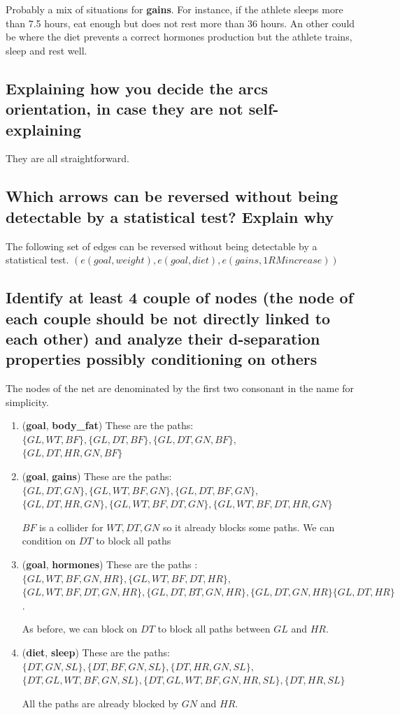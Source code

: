 \documentclass[11pt]{article}
\begin{document}
Probably a mix of situations for \textbf{gains}. For instance, if the athlete sleeps more than 7.5 hours, eat enough but does not rest more than 36 hours. An other could be where the diet prevents a correct hormones production but the athlete trains, sleep and rest well.

\subsection{Explaining how you decide the arcs orientation, in case they are not self- explaining}

They are all straightforward.

\subsection{Which arrows can be reversed without being detectable by a statistical test? Explain why}

The following set of edges can be reversed without being detectable by a statistical test.
$(e(goal, weight), e(goal, diet), e(gains, 1RM increase))$


\subsection{Identify at least 4 couple of nodes (the node of each couple should be not directly linked to each other) and analyze their d-separation properties possibly conditioning on others}

The nodes of the net are denominated by the first two consonant in the name for simplicity.
\begin{enumerate}
	\item (\textbf{goal}, \textbf{body\_fat})
These are the paths: $\{GL,WT,BF\}, \{GL,DT,BF\}, \{GL,DT,GN,BF\},$\\ $\{GL,DT,HR,GN, BF\}$

\item (\textbf{goal}, \textbf{gains})
These are the paths: $\{GL,DT,GN\}, \{GL, WT, BF, GN\}, \{GL,DT, BF, GN\},$\\
$\{GL, DT ,HR, GN\}, \{GL, WT, BF, DT, GN \}, \{GL, WT, BF, DT, HR, GN \}$


$BF$ is a collider for $WT, DT, GN$ so it already blocks some paths. We can condition on $DT$ to block all paths
\item (\textbf{goal}, \textbf{hormones})
These are the paths : $\{GL, WT, BF, GN, HR \}, \{GL, WT, BF, DT, HR \},$\\
$\{GL, WT, BF, DT, GN, HR \},\{GL, DT, BT, GN, HR \}, \{GL, DT, GN, HR \} \{GL, DT, HR \}$.

As before, we can block on $DT$ to block all paths between $GL$ and $HR$.

\item (\textbf{diet}, \textbf{sleep})
These are the paths: $\{DT, GN, SL \}, \{DT, BF, GN, SL \}, \{DT, HR, GN, SL \},$\\$
\{DT, GL , WT, BF, GN, SL \},  \{DT, GL , WT, BF, GN, HR, SL \}, \{DT, HR, SL\}$

All the paths are already blocked by $GN$ and $HR$.
\end{enumerate}
\end{document}
